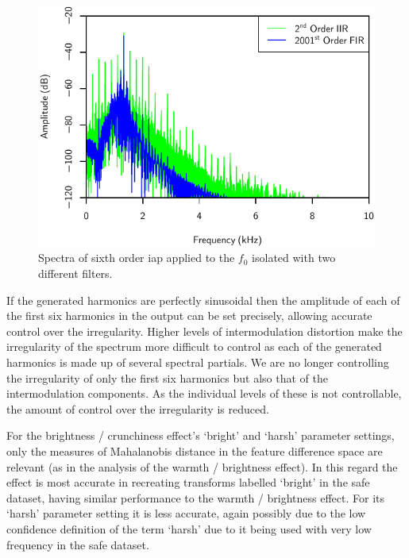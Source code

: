 			\begin{figure}[h!]
				\centering
				\includegraphics{chapter7/Images/CelloFilterOrderSpectra.pdf}
				\caption{Spectra of sixth order \acrshort{iap} applied to the $f_{0}$ isolated with two
					 different filters.}
				\label{fig:CelloFilterOrderSpectra}
			\end{figure}

			If the generated harmonics are perfectly sinusoidal then the amplitude of each of the first six
			harmonics in the output can be set precisely, allowing accurate control over the irregularity.
			Higher levels of intermodulation distortion make the irregularity of the spectrum more difficult to
			control as each of the generated harmonics is made up of several spectral partials. We are no
			longer controlling the irregularity of only the first six harmonics but also that of the
			intermodulation components. As the individual levels of these is not controllable, the amount of
			control over the irregularity is reduced.

			For the brightness / crunchiness effect's `bright' and `harsh' parameter settings, only the
			measures of Mahalanobis distance in the feature difference space are relevant (as in the analysis
			of the warmth / brightness effect). In this regard the effect is most accurate in recreating
			transforms labelled `bright' in the \acrshort{safe} dataset, having similar performance to the
			warmth / brightness effect.  For its `harsh' parameter setting it is less accurate, again possibly
			due to the low confidence definition of the term `harsh' due to it being used with very low
			frequency in the \acrshort{safe} dataset.

